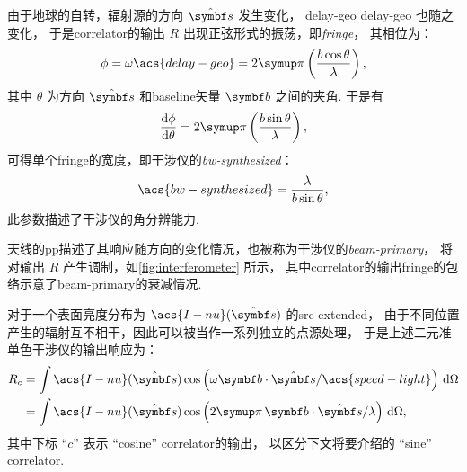 由于地球的自转，辐射源的方向 $\hat{\B{s}}$ 发生变化，
\acl{delay-geo} \acs{delay-geo} 也随之变化，
于是\ac{correlator}的输出 $R$ 出现正弦形式的振荡，即\emph{\acf{fringe}}，
其相位为：
\begin{equation}
  \phi = \omega \acs{delay-geo}
    = 2\Cpi \left( \frac{b \cos\theta}{\lambda} \right),
\end{equation}
其中 $\theta$ 为方向 $\hat{\B{s}}$ 和\ac{baseline}矢量 $\B{b}$ 之间的夹角.
于是有
\begin{equation}
  \diff{\phi}{\theta} = 2\Cpi \left( \frac{b \sin\theta}{\lambda} \right),
\end{equation}
可得单个\ac{fringe}的宽度，即干涉仪的\emph{\acf{bw-synthesized}}：
\begin{equation}
  \label{eq:bw-synthesized}
  \acs{bw-synthesized} = \frac{\lambda}{b \sin\theta},
\end{equation}
此参数描述了干涉仪的角分辨能力.

天线的\ac{pp}描述了其响应随方向的变化情况，也被称为干涉仪的\emph{\acf{beam-primary}}，
将对输出 $R$ 产生调制，如\autoref{fig:interferometer} 所示，
其中\ac{correlator}的输出\ac{fringe}的包络示意了\ac{beam-primary}的衰减情况.

对于一个表面亮度分布为 $\acs{I-nu}(\hat{\B{s}})$ 的\ac{src-extended}，
由于不同位置产生的辐射互不相干，因此可以被当作一系列独立的点源处理，
于是上述二元准单色干涉仪的输出响应为：
\begin{align}
  \label{eq:resp-cos}
  R_c & = \int \acs{I-nu}(\hat{\B{s}})
      \cos \left( \omega \B{b}\cdot\hat{\B{s}} / \acs{speed-light} \right)
      \,\D{\Omega}  \\
    & = \int \acs{I-nu}(\hat{\B{s}}) \cos \left(
      2\Cpi\, \B{b}\cdot\hat{\B{s}} / \lambda \right) \,\D{\Omega},
\end{align}
其中下标 \enquote{$c$} 表示 \enquote{cosine} \ac{correlator}的输出，
以区分下文将要介绍的 \enquote{sine} \ac{correlator}.

